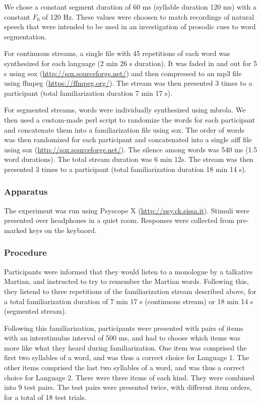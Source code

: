 \documentclass[]{article}
\begin{document}
We chose a constant segment duration of 60 ms (syllable duration 120 ms)
with a constant \(F_0\) of 120 Hz. These values were choosen to match
recordings of natural speech that were intended to be used in an
investigation of prosodic cues to word segmentation.

For continuous streams, a single file with 45 repetitions of each word
was synthesized for each language (2 min 26 s duration). It was faded in
and out for 5 s using sox (\url{http://sox.sourceforge.net/}) and then
compressed to an mp3 file using ffmpeg (\url{https://ffmpeg.org/}). The
stream was then presented 3 times to a participant (total
familiarization duration 7 min 17 s).

For segmented streams, words were individually synthesized using mbrola.
We then used a custom-made perl script to randomize the words for each
participant and concatenate them into a familiarization file using sox.
The order of words was then randomized for each participant and
concatenated into a single aiff file using sox
(\url{http://sox.sourceforge.net/}). The silence among words was 540 ms
(1.5 word durations). The total stream duration was 6 min 12s. The
stream was then presented 3 times to a participant (total
familiarization duration 18 min 14 s).

\subsubsection{Apparatus}\label{apparatus}

The experiment was run using Psyscope X (\url{http://psy.ck.sissa.it}).
Stimuli were presented over headphones in a quiet room. Responses were
collected from pre-marked keys on the keybaord.

\subsubsection{Procedure}\label{procedure}

Participants were informed that they would listen to a monologue by a
talkative Martian, and instructed to try to remember the Martian words.
Following this, they listend to three repetitions of the familiarization
stream described above, for a total familiarization duration of 7 min 17
s (continuous stream) or 18 min 14 s (segmented stream).

Following this familiarization, participants were presented with pairs
of items with an interstimulus interval of 500 ms, and had to choose
which items was more like what they heard during familiarization. One
item was comprised the first two syllables of a word, and was thus a
correct choice for Language 1. The other items comprised the last two
syllables of a word, and was thus a correct choice for Language 2. There
were three items of each kind. They were combined into 9 test pairs. The
test pairs were presented twice, with different item orders, for a total
of 18 test trials.
\end{document}
